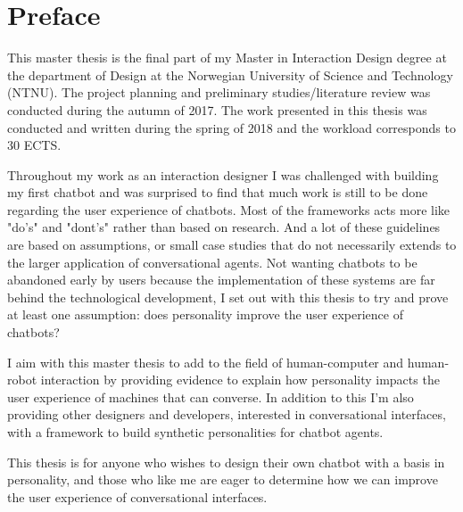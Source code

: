 \hypersetup{pageanchor=false}
%

\chapter*{Preface}
This master thesis is the final part of my Master in Interaction Design degree at the department of Design at the Norwegian University of Science and Technology (NTNU). The project planning and preliminary studies/literature review was conducted during the autumn of 2017. The work presented in this thesis was conducted and written during the spring of 2018 and the workload corresponds to 30 ECTS.

Throughout my work as an interaction designer I was challenged with building my first chatbot and was surprised to find that much work is still to be done regarding the user experience of chatbots. Most of the frameworks acts more like "do's" and "dont's" rather than based on research. And a lot of these guidelines are based on assumptions, or small case studies that do not necessarily extends to the larger application of conversational agents. Not wanting chatbots to be abandoned early by users because the implementation of these systems are far behind the technological development, I set out with this thesis to try and prove at least one assumption: does personality improve the user experience of chatbots?

I aim with this master thesis to add to the field of human-computer and human-robot interaction by providing evidence to explain how personality impacts the user experience of machines that can converse. In addition to this I'm also providing other designers and developers, interested in conversational interfaces, with a framework to build synthetic personalities for chatbot agents.

This thesis is for anyone who wishes to design their own chatbot with a basis in personality, and those who like me are eager to determine how we can improve the user experience of conversational interfaces.

\vspace{5mm}

\thesisdate \\[1pc]
\\[1pc]
